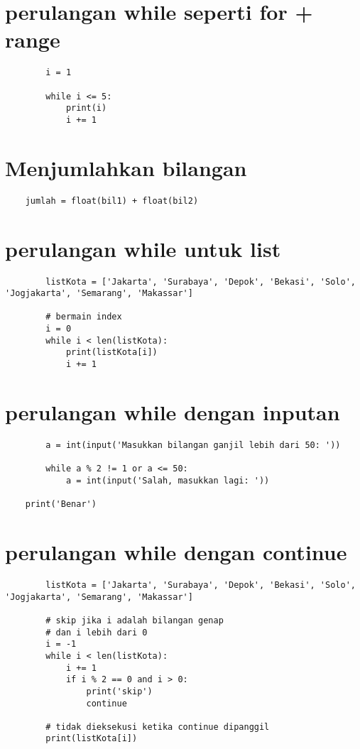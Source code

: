 \documentclass{article}
\begin{document}
	\section {perulangan while seperti for + range}
	\begin{lstlisting}
		i = 1
		
		while i <= 5:
			print(i)
			i += 1
	\end{lstlisting}
	
	\section {Menjumlahkan bilangan}
	\begin{lstlisting}
	jumlah = float(bil1) + float(bil2)
	\end{lstlisting}
	
	\section {perulangan while untuk list}
	\begin{lstlisting}
		listKota = ['Jakarta', 'Surabaya', 'Depok', 'Bekasi', 'Solo', 'Jogjakarta', 'Semarang', 'Makassar']
		
		# bermain index
		i = 0
		while i < len(listKota):
			print(listKota[i])
			i += 1
	\end{lstlisting}
	
	\section {perulangan while dengan inputan}
	\begin{lstlisting}
		a = int(input('Masukkan bilangan ganjil lebih dari 50: '))
		
		while a % 2 != 1 or a <= 50:
			a = int(input('Salah, masukkan lagi: '))
	
	print('Benar')
	\end{lstlisting}
	
	\section {perulangan while dengan continue}
	\begin{lstlisting}
		listKota = ['Jakarta', 'Surabaya', 'Depok', 'Bekasi', 'Solo', 'Jogjakarta', 'Semarang', 'Makassar']
		
		# skip jika i adalah bilangan genap
		# dan i lebih dari 0
		i = -1
		while i < len(listKota):
			i += 1
			if i % 2 == 0 and i > 0:
				print('skip')
				continue
		
		# tidak dieksekusi ketika continue dipanggil
		print(listKota[i])
	\end{lstlisting}
	
\end{document}

